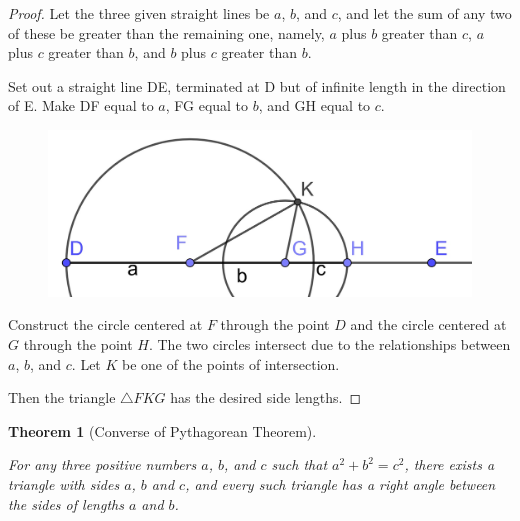 \documentclass[
]{book}
\newtheorem{theorem}{Theorem}[chapter]
\theoremstyle{definition}
\theoremstyle{definition}
\theoremstyle{definition}
\theoremstyle{definition}
\theoremstyle{remark}
\begin{document}
\begin{proof}

Let the three given straight lines be \(a\), \(b\), and \(c\), and let the sum of any two of these be greater than the remaining one, namely, \(a\) plus \(b\) greater than \(c\), \(a\) plus \(c\) greater than \(b\), and \(b\) plus \(c\) greater than \(b\).

Set out a straight line DE, terminated at D but of infinite length in the direction of E. Make DF equal to \(a\), FG equal to \(b\), and GH equal to \(c\).

\begin{figure}

{\centering \includegraphics[width=0.5\linewidth]{images/prop22a} 

}

\end{figure}

Construct the circle centered at \(F\) through the point \(D\) and the circle centered at \(G\) through the point \(H\). The two circles intersect due to the relationships between \(a\), \(b\), and \(c\). Let \(K\) be one of the points of intersection.

Then the triangle \(\triangle FKG\) has the desired side lengths.

\end{proof}

\begin{theorem}[Converse of Pythagorean Theorem]
\protect\hypertarget{thm:unlabeled-div-209}{}\label{thm:unlabeled-div-209}

For any three positive numbers \(a\), \(b\), and \(c\) such that \(a^2 + b^2 = c^2\), there exists a triangle with sides \(a\), \(b\) and \(c\), and every such triangle has a right angle between the sides of lengths \(a\) and \(b\).

\end{theorem}
\end{document}
